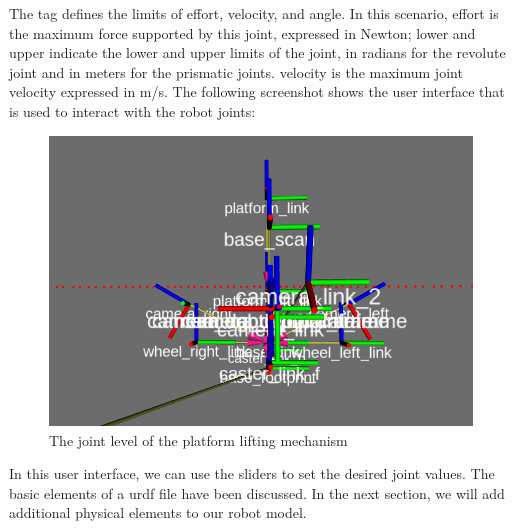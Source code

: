 \documentclass[../../main]{subfiles}
\begin{document}
The  tag defines the limits of effort, velocity, and angle. In this scenario,
effort is the maximum force supported by this joint, expressed in Newton; lower
and upper indicate the lower and upper limits of the joint, in radians for the revolute
joint and in meters for the prismatic joints. velocity is the maximum joint velocity
expressed in m/s.
The following screenshot shows the user interface that is used to interact with the robot
joints:
\begin{figure}[ht]
    \centering
    \includegraphics[width=\textwidth]{img/robotjoints.png}
    \caption{The joint level of the platform lifting mechanism}
    \end{figure}
    In this user interface, we can use the sliders to set the desired joint values. The basic
    elements of a urdf file have been discussed. In the next section, we will add additional
    physical elements to our robot model.
\end{document}

